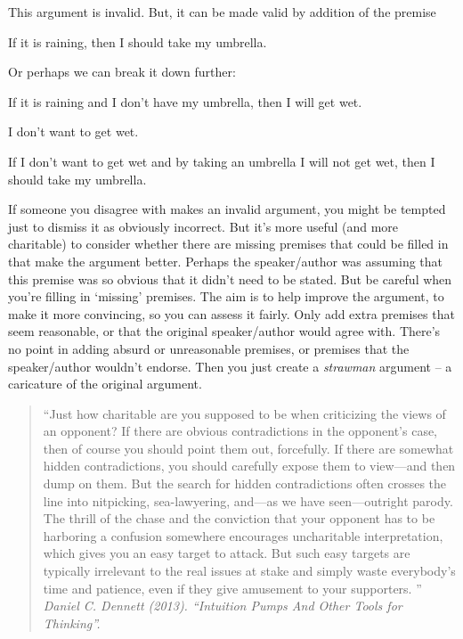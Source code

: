 This argument is invalid. But, it can be made valid by addition of the premise 
\begin{earg}
\item[] If it is raining, then I should take my umbrella.
\end{earg}
Or perhaps we can break it down further:
\begin{earg}
\item[] If it is raining and I don't have my umbrella, then I will get wet.
\item[] I don't want to get wet. 
\item[] If I don't want to get wet and by taking an umbrella I will not get wet, then I should take my umbrella.
\end{earg}


If someone you disagree with makes an invalid
argument, you might be tempted just to dismiss it as
obviously incorrect.
But it’s more useful (and more charitable) to consider
whether there are missing premises that could be filled
in that make the argument better.
Perhaps the speaker/author was assuming that this
premise was so obvious that it didn’t need to be stated.
But be careful when you’re filling in ‘missing’ premises.
The aim is to help improve the argument, to make it
more convincing, so you can assess it fairly.
Only add extra premises that seem reasonable, or that
the original speaker/author would agree with.
There’s no point in adding absurd or unreasonable
premises, or premises that the speaker/author wouldn’t
endorse. Then you just create a \emph{strawman} argument –
a caricature of the original argument.


\begin{quotation}
“Just how charitable are you supposed to be when criticizing the views of an opponent? If there are obvious contradictions in the opponent’s case, then of course you should point them out, forcefully. If there are somewhat hidden contradictions, you should carefully expose them to view—and then dump on them. But the search for hidden contradictions often crosses the line into nitpicking, sea-lawyering, and—as we have seen—outright parody. The thrill of the chase and the conviction that your opponent has to be harboring a confusion somewhere encourages uncharitable interpretation, which gives you an easy target to attack. But such easy targets are typically irrelevant to the real issues at stake and simply waste everybody’s time and patience, even if they give amusement to your supporters. ”\\
\emph{Daniel C. Dennett (2013). “Intuition Pumps And Other Tools for Thinking”. }
\end{quotation}


